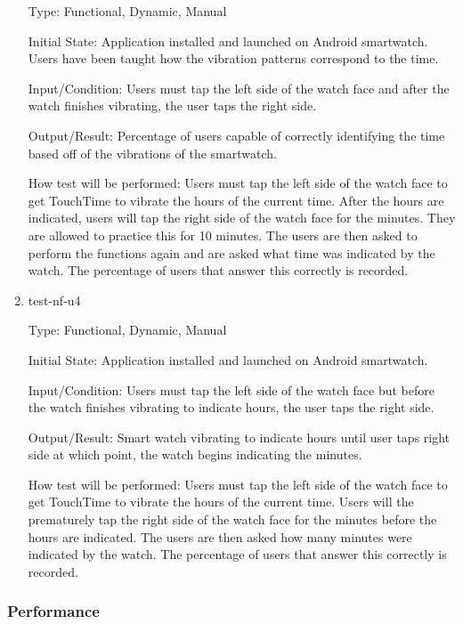 \begin{enumerate}
Type: Functional, Dynamic, Manual
					
Initial State: Application installed and launched on Android smartwatch. Users have been taught how the vibration patterns correspond to the time.
					
Input/Condition: Users must tap the left side of the watch face and after the watch finishes vibrating, the user taps the right side.
					
Output/Result: Percentage of users capable of correctly identifying the time based off of the vibrations of the smartwatch. 
					
How test will be performed: Users must tap the left side of the watch face to get TouchTime to vibrate the hours of the current time. After the hours are indicated, users will tap the right side of the watch face for the minutes. They are allowed to practice this for 10 minutes. The users are then asked to perform the functions again and are asked what time was indicated by the watch. The percentage of users that answer this correctly is recorded. 

\item{test-nf-u4\\}

Type: Functional, Dynamic, Manual
					
Initial State: Application installed and launched on Android smartwatch. 
					
Input/Condition: Users must tap the left side of the watch face but before the watch finishes vibrating to indicate hours, the user taps the right side.
					
Output/Result: Smart watch vibrating to indicate hours until user taps right side at which point, the watch begins indicating the minutes. 
					
How test will be performed: Users must tap the left side of the watch face to get TouchTime to vibrate the hours of the current time. Users will the prematurely tap the right side of the watch face for the minutes before the hours are indicated. The users are then asked how many minutes were indicated by the watch. The percentage of users that answer this correctly is recorded. 

\end{enumerate}

\subsubsection{Performance}

